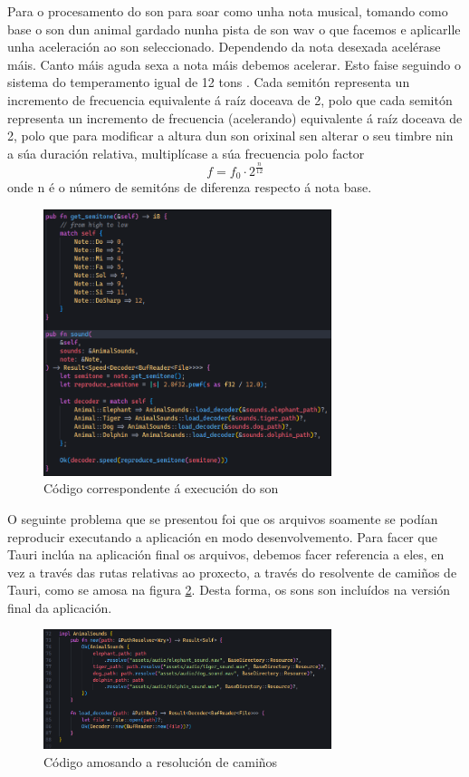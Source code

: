 Para o procesamento do son para soar como unha nota musical, tomando como base o son dun animal gardado nunha pista de son wav o que facemos e aplicarlle unha aceleración ao son seleccionado. Dependendo da nota desexada acelérase máis. Canto máis aguda sexa a nota máis debemos acelerar. Esto faise seguindo o sistema do temperamento igual de 12 tons \cite{Semitone}. Cada semitón representa un incremento de frecuencia equivalente á raíz doceava de 2, polo que cada semitón representa un incremento de frecuencia (acelerando) equivalente á raíz doceava de 2, polo que para modificar a altura dun son orixinal sen alterar o seu timbre nin a súa duración relativa, multiplícase a súa frecuencia polo factor 
\[
f = f_0 \cdot 2^{\frac{n}{12}}
\]
onde n é o número de semitóns de diferenza respecto á nota base.

\begin{figure}[hp!]
  \centering
  \includegraphics[width=0.75\textwidth]{imaxes/semitone.png}
  \caption{Código correspondente á execución do son}
  \label{fig:semitone}
\end{figure}

O seguinte problema que se presentou foi que os arquivos soamente se podían reproducir executando a aplicación en modo desenvolvemento. Para facer que Tauri inclúa na aplicación final os arquivos, debemos facer referencia a eles, en vez a través das rutas relativas ao proxecto, a través do resolvente de camiños de Tauri, como se amosa na figura \ref{fig:resolvePath}. Desta forma, os sons son incluídos na versión final da aplicación.

\begin{figure}[hp!]
  \centering
  \includegraphics[width=0.75\textwidth]{imaxes/resolvePath.png}
  \caption{Código amosando a resolución de camiños}
  \label{fig:resolvePath}
\end{figure}

